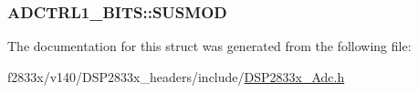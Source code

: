 \subsubsection[{S\+U\+S\+M\+O\+D}]{ A\+D\+C\+T\+R\+L1\+\_\+\+B\+I\+T\+S\+::\+S\+U\+S\+M\+O\+D}\label{struct_a_d_c_t_r_l1___b_i_t_s_a5504e1601d17c97df6417aa3d02e6068}


The documentation for this struct was generated from the following file\+:\begin{DoxyCompactItemize}
\item 
f2833x/v140/\+D\+S\+P2833x\+\_\+headers/include/\hyperlink{_d_s_p2833x___adc_8h}{D\+S\+P2833x\+\_\+\+Adc.\+h}\end{DoxyCompactItemize}
